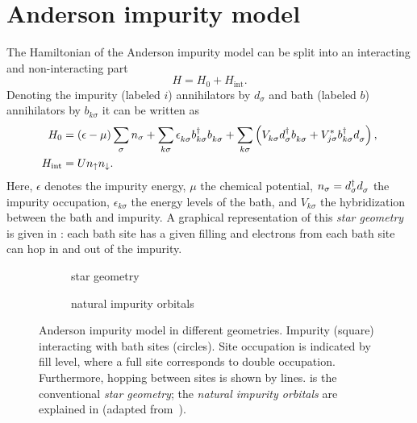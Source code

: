 \section{Anderson impurity model}
\label{sec:anderson-impurity-model}

The Hamiltonian of the Anderson impurity model \cite{Anderson1961} can be split into
an interacting and non-interacting part
\begin{equation}
    H = H_0 + H_\mathrm{int}.
    \label{eq:impurity-Hamiltonian}
\end{equation}
Denoting the impurity (labeled $i$) annihilators by $d_\sigma$
and bath (labeled $b$) annihilators by $b_{k\sigma}$
it can be written as
\begin{align}
    H_0
     & =
    (\epsilon - \mu) \sum_{\pk\sigma} n_\sigma
    +
    \sum_{k\sigma} \epsilon_{k\sigma}^{\pdag} b^\dag_{k\sigma} b^{\pdag}_{k\sigma}
    +
    \sum_{k\sigma} \left(V^{\ps}_{k\sigma} d^\dag_{\pk\sigma} b^{\pdag}_{k\sigma}
    + V_{j\sigma}^* b^\dag_{k\sigma} d^{\pdag}_{\pk\sigma} \right),
    \label{eq:anderson-non-interacting}
    \\
    H_\mathrm{int}
     & =
    U n_\uparrow n_\downarrow.
    \label{eq:anderson-interaction}
\end{align}
Here,
$\epsilon$ denotes the impurity energy,
$\mu$ the chemical potential,
$n_\sigma = d^\dag_\sigma d^{\pdag}_\sigma$ the impurity occupation,
$\epsilon_{k\sigma}$ the energy levels of the bath,
and $V_{k\sigma}$ the hybridization between the bath and impurity.
A graphical representation of this \emph{star geometry} is given in :
each bath site has a given filling
and electrons from each bath site can hop in and out of the impurity.

\begin{figure}[ht]
    \centering
    \savebox{\imagebox}{} %
    \begin{subfigure}{0.45\textwidth}
        \centering
        \usebox{\imagebox}
        \caption{star geometry}
        \label{subfig:geometry-star}
    \end{subfigure}
    \begin{subfigure}{0.45\textwidth}
        \centering
        \raisebox{\dimexpr0.5\ht\imagebox-0.5\height}
        {
            
        }
        \caption{natural impurity orbitals}
        \label{subfig:geometry-natural-impurity-orbitals}
    \end{subfigure}
    \caption{
        Anderson impurity model in different geometries.
        Impurity (square) interacting with bath sites (circles).
        Site occupation is indicated by fill level,
        where a full site corresponds to double occupation.
        Furthermore, hopping between sites is shown by lines.
         is the conventional \emph{star geometry};
         the \emph{natural impurity orbitals}
        are explained in 
        (adapted from~\cite{Lu2019}).
    }
\end{figure}

